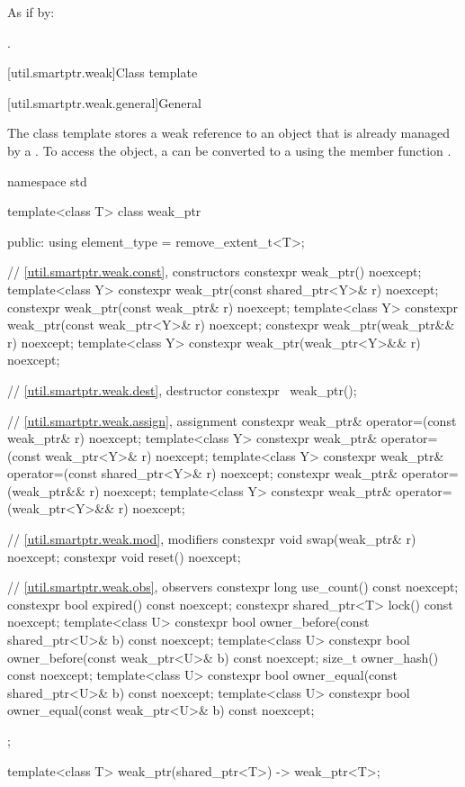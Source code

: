 \begin{itemdescr}
\pnum
\effects
As if by: 

\pnum
\returns
{}.
\end{itemdescr}

[util.smartptr.weak]{Class template }

[util.smartptr.weak.general]{General}

\pnum
{}%
The  class template stores a weak reference to an object
that is already managed by a . To access the object, a
 can be converted to a  using the member
function .

\begin{codeblock}
namespace std {
  template<class T> class weak_ptr {
  public:
    using element_type = remove_extent_t<T>;

    // \ref{util.smartptr.weak.const}, constructors
    constexpr weak_ptr() noexcept;
    template<class Y>
      constexpr weak_ptr(const shared_ptr<Y>& r) noexcept;
    constexpr weak_ptr(const weak_ptr& r) noexcept;
    template<class Y>
      constexpr weak_ptr(const weak_ptr<Y>& r) noexcept;
    constexpr weak_ptr(weak_ptr&& r) noexcept;
    template<class Y>
      constexpr weak_ptr(weak_ptr<Y>&& r) noexcept;

    // \ref{util.smartptr.weak.dest}, destructor
    constexpr ~weak_ptr();

    // \ref{util.smartptr.weak.assign}, assignment
    constexpr weak_ptr& operator=(const weak_ptr& r) noexcept;
    template<class Y>
      constexpr weak_ptr& operator=(const weak_ptr<Y>& r) noexcept;
    template<class Y>
      constexpr weak_ptr& operator=(const shared_ptr<Y>& r) noexcept;
    constexpr weak_ptr& operator=(weak_ptr&& r) noexcept;
    template<class Y>
      constexpr weak_ptr& operator=(weak_ptr<Y>&& r) noexcept;

    // \ref{util.smartptr.weak.mod}, modifiers
    constexpr void swap(weak_ptr& r) noexcept;
    constexpr void reset() noexcept;

    // \ref{util.smartptr.weak.obs}, observers
    constexpr long use_count() const noexcept;
    constexpr bool expired() const noexcept;
    constexpr shared_ptr<T> lock() const noexcept;
    template<class U>
      constexpr bool owner_before(const shared_ptr<U>& b) const noexcept;
    template<class U>
      constexpr bool owner_before(const weak_ptr<U>& b) const noexcept;
    size_t owner_hash() const noexcept;
    template<class U>
      constexpr bool owner_equal(const shared_ptr<U>& b) const noexcept;
    template<class U>
      constexpr bool owner_equal(const weak_ptr<U>& b) const noexcept;
  };

  template<class T>
    weak_ptr(shared_ptr<T>) -> weak_ptr<T>;
}
\end{codeblock}

